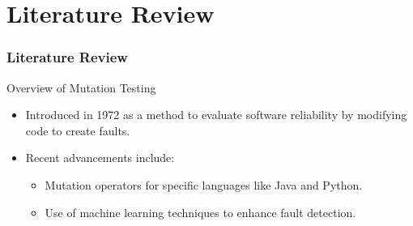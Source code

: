 \documentclass[12pt]{beamer}
\theoremstyle{remark}
\theoremstyle{definition}
\begin{document}
\section{Literature Review}


\begin{frame}[allowframebreaks]
\frametitle{Literature Review}
\begin{block}{Overview of Mutation Testing}
\begin{itemize}
    \item Introduced in 1972 as a method to evaluate software reliability by modifying code to create faults.
    \item Recent advancements include:
    \begin{itemize}
        \item Mutation operators for specific languages like Java and Python.
        \item Use of machine learning techniques to enhance fault detection.
    \end{itemize}
\end{itemize}
\end{block}


\end{frame}
\end{document}
